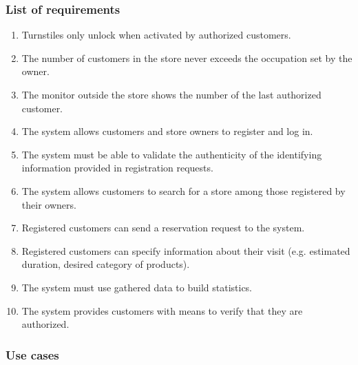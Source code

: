 \subsubsection{List of requirements}
\begin{enumerate}[label=R\arabic*]
	\item Turnstiles only unlock when activated by authorized customers.
	\item The number of customers in the store never exceeds the occupation set by the owner.
	\item The monitor outside the store shows the number of the last authorized customer.
	\item The system allows customers and store owners to register and log in.
	\item The system must be able to validate the authenticity of the identifying information provided in registration requests.
	\item The system allows customers to search for a store among those registered by their owners.
	\item Registered customers can send a reservation request to the system.
	\item Registered customers can specify information about their visit (e.g. estimated duration, desired category of products).
	\item The system must use gathered data to build statistics. %
	\item The system provides customers with means to verify that they are authorized.
\end{enumerate}
\subsubsection{Use cases}
